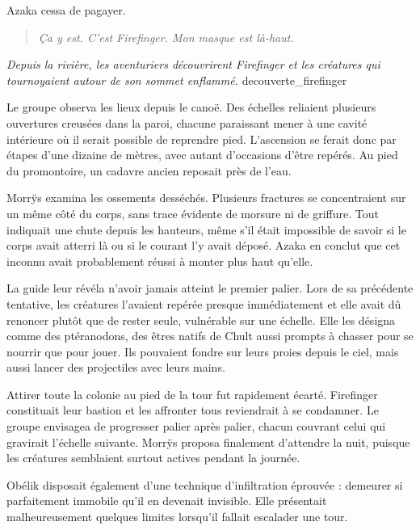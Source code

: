 Azaka cessa de pagayer.

\begin{quote}\itshape
Ça y est. C'est Firefinger. Mon masque est là-haut.
\end{quote}

{\textit{Depuis la rivière, les aventuriers découvrirent Firefinger et les créatures qui tournoyaient autour de son sommet enflammé.}}
{decouverte_firefinger}

Le groupe observa les lieux depuis le canoë. Des échelles reliaient plusieurs ouvertures creusées dans la paroi, chacune paraissant mener à une cavité intérieure où il serait possible de reprendre pied. L'ascension se ferait donc par étapes d'une dizaine de mètres, avec autant d'occasions d'être repérés. Au pied du promontoire, un cadavre ancien reposait près de l'eau.

Morrÿs examina les ossements desséchés. Plusieurs fractures se concentraient sur un même côté du corps, sans trace évidente de morsure ni de griffure. Tout indiquait une chute depuis les hauteurs, même s'il était impossible de savoir si le corps avait atterri là ou si le courant l'y avait déposé. Azaka en conclut que cet inconnu avait probablement réussi à monter plus haut qu'elle.

La guide leur révéla n'avoir jamais atteint le premier palier. Lors de sa précédente tentative, les créatures l'avaient repérée presque immédiatement et elle avait dû renoncer plutôt que de rester seule, vulnérable sur une échelle. Elle les désigna comme des ptéranodons, des êtres natifs de Chult aussi prompts à chasser pour se nourrir que pour jouer. Ils pouvaient fondre sur leurs proies depuis le ciel, mais aussi lancer des projectiles avec leurs mains.

Attirer toute la colonie au pied de la tour fut rapidement écarté. Firefinger constituait leur bastion et les affronter tous reviendrait à se condamner. Le groupe envisagea de progresser palier après palier, chacun couvrant celui qui gravirait l'échelle suivante. Morrÿs proposa finalement d'attendre la nuit, puisque les créatures semblaient surtout actives pendant la journée.

\begin{narrateur}
Obélik disposait également d'une technique d'infiltration éprouvée : demeurer si parfaitement immobile qu'il en devenait invisible. Elle présentait malheureusement quelques limites lorsqu'il fallait escalader une tour.
\end{narrateur}

